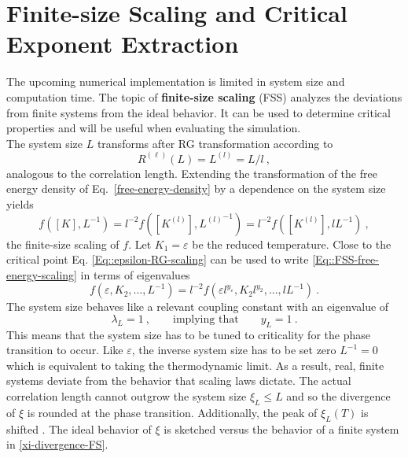	\section{Finite-size Scaling and Critical Exponent Extraction} \label{Section::FSS}
	The upcoming numerical implementation is limited in system size and computation time. The topic of \textbf{finite-size scaling }(FSS) analyzes the deviations from finite systems from the ideal behavior. It can be used to determine critical properties and will be useful when evaluating the simulation. \\
	
	The system size $L$ transforms after RG transformation according to
	\begin{equation}
		R^{(\ell)}(L) =	L^{(l)} =	L /	l ~,
	\end{equation}
	analogous to the correlation length. Extending the transformation of the free energy density of Eq.~\eqref{free-energy-density} by a dependence on the system size yields
	\begin{equation}\label{Eq::FSS-free-energy-scaling}
		f\left([K], L^{-1}\right) =	l^{-2} f\left([K^{(l)}], {L^{(l)}}^{-1}\right) = l^{-2} f\left([K^{(l)}], l{L}^{-1}\right)	 ~,
	\end{equation}
	the finite-size scaling of $f$.
	Let $K_1 =	\varepsilon$ be the reduced temperature. Close to the critical point Eq. \eqref{Eq::epsilon-RG-scaling} can be used to write \eqref{Eq::FSS-free-energy-scaling} in terms of eigenvalues
	\begin{equation}
		f\left(\varepsilon, K_2, ..., L^{-1}\right) = l^{-2} f\left(\varepsilon l^{y_\varepsilon}, K_2 l^{y_2}, ..., l{L}^{-1}\right)	 ~.
	\end{equation}
	The system size behaves like a relevant coupling constant with an eigenvalue of
	\begin{equation}
		\lambda_L =	1~, \qquad \text{implying that} \qquad y_L =	1 ~.
	\end{equation}
	This means that the system size has to be tuned to criticality for the phase transition to occur. Like $\varepsilon$, the inverse system size has to be set zero $L^{-1} =	0$ which is equivalent to taking the thermodynamic limit. As a result, real, finite systems deviate from the behavior that scaling laws dictate. The actual correlation length cannot outgrow the system size $\xi_L \leq L$ and so the divergence of $\xi$ is rounded at the phase transition. Additionally,  the peak of $\xi_L(T)$ is shifted \cite{domb1983vol8}. The ideal behavior of $\xi$ is sketched versus the behavior of a finite system in  \autoref{xi-divergence-FS}. \\
	
